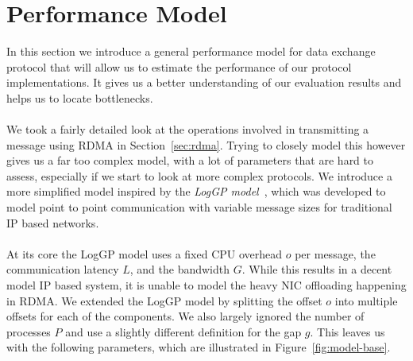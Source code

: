 \section{Performance Model}\label{sec:perf-model} \label{sec:model}
In this section we introduce a general performance model for data exchange protocol that will allow us to estimate the 
performance of our protocol implementations. It gives us a better understanding of our evaluation results and helps us 
to locate bottlenecks.

\paragraph{}We took a fairly detailed look at the operations involved in transmitting a message using RDMA in Section~\ref{sec:rdma}.
Trying to closely model this however gives us a far too complex model, with a lot of parameters that are hard to assess,
especially if we start to look at more complex protocols. We introduce a more simplified model inspired by the  
\emph{LogGP model}~\cite{loggp}, which was developed  to model point to point communication with variable message sizes for 
traditional IP based networks.

\paragraph{} At its core the LogGP model uses a fixed CPU overhead $o$ per message, the communication latency $L$, and 
the bandwidth $G$. While this results in a decent model IP based system, it is unable to model the heavy NIC offloading 
happening in RDMA. We extended the LogGP model by splitting the offset $o$ into multiple offsets for each of the components.
We also largely ignored the number of processes $P$ and use a slightly different definition for the gap $g$. This leaves 
us with the following parameters, which are illustrated in Figure~\ref{fig:model-base}.

